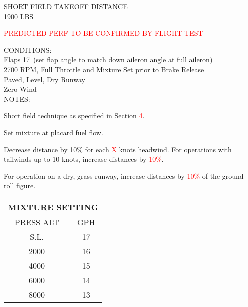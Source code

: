 \begin{sidewaysfigure}[t]
\begin{center}
\begin{perfhdr}SHORT FIELD TAKEOFF DISTANCE\\
1900 LBS
\end{perfhdr}
\Large
\textcolor{red}{PREDICTED PERF TO BE CONFIRMED BY FLIGHT TEST}\normalsize \vspace{5ex}\\

\begin{minipage}{7.5in}
  \begin{flushleft}
    CONDITIONS:\\
    Flaps 17\textdegree \ (set flap angle to match down aileron angle at full aileron)\\
    2700 RPM, Full Throttle and Mixture Set prior to Brake Release\\
    Paved, Level, Dry Runway\\
    Zero Wind\\
\vspace{\perfnoteskip}
    NOTES:
    \begin{enumerate*}
      \item Short field technique as specified in Section \textcolor{red}{4}.
      \item Set mixture at placard fuel flow.
      \item Decrease distance by 10\% for each \textcolor{red}{X} knots headwind.  For operations with tailwinds up to 10
      knots, increase distances by \textcolor{red}{10\%}.
      \item For operation on a dry, grass runway, increase distances by \textcolor{red}{10\%} of the ground roll figure.
      \end{enumerate*}
    \end{flushleft}
  \end{minipage}
\hfill
\begin{minipage}{1.5in}
  \begin{tabular}{|c|c|}
    \hline
    \multicolumn{2}{|c|}{MIXTURE SETTING}\\
    \hline
    PRESS ALT&GPH\\
    \hline
    S.L.&17\\
    2000&16\\
    4000&15\\
    6000&14\\
    8000&13\\
    \hline
    \end{tabular}
  \end{minipage}
\\


\end{center}
\end{sidewaysfigure}
